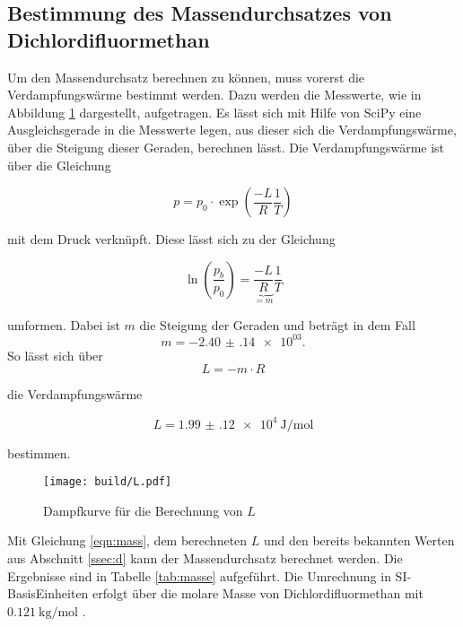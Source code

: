 \subsection{Bestimmung des Massendurchsatzes von Dichlordifluormethan}
\label{ssec:e}
Um den Massendurchsatz berechnen zu können, muss vorerst die Verdampfungswärme bestimmt werden. Dazu werden die Messwerte, wie in Abbildung \ref{fig:dampfdruck_plot} dargestellt, aufgetragen. Es lässt sich mit Hilfe von SciPy \cite{scipy} eine Ausgleichsgerade in die Messwerte legen, aus dieser sich die Verdampfungswärme, über die Steigung dieser Geraden, berechnen lässt. 
Die Verdampfungswärme ist über die Gleichung

\begin{equation}
    p = p_0 \cdot \exp{\left(\frac{-L}{R}\frac{1}{T}\right)}
    \label{eq:L}
\end{equation}

mit dem Druck verknüpft. Diese lässt sich zu der Gleichung


\begin{equation}
    \ln{\left(\frac{p_b}{p_0}\right)} = \underbrace{\frac{-L}{R}}_{=m} \frac{1}{T}
    \label{eq:L2}
\end{equation}

umformen. Dabei ist $m$ die Steigung der Geraden und beträgt in dem Fall 
\begin{equation*}
    m=\num{-2.40(14)e+03}.
\end{equation*}
So lässt sich über
\begin{equation}
    L=-m \cdot R
\end{equation}

die Verdampfungswärme 

\begin{equation*}
    L = \SI{1.99(12)e4}{\joule\per\mol}
    \label{eq:L3}
\end{equation*}

bestimmen. 

\begin{figure}
    \centering
    \texttt{[image: build/L.pdf]}
    \caption{Dampfkurve für die Berechnung von $L$}
    \label{fig:dampfdruck_plot}
\end{figure}

Mit Gleichung \eqref{eqn:mass}, dem berechneten $L$ und den bereits bekannten Werten aus Abschnitt \ref{ssec:d} kann der Massendurchsatz berechnet werden. Die Ergebnisse sind in Tabelle \ref{tab:masse} aufgeführt. Die Umrechnung in SI-BasisEinheiten erfolgt über die molare Masse von Dichlordifluormethan mit $\SI{0.121}{\kilo\g\per\mol}$ \cite{V206}.

